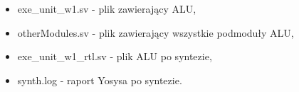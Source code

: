 \begin{itemize}
	\item exe\_unit\_w1.sv - plik zawierający ALU,
	\item otherModules.sv - plik zawierający wszystkie podmoduły ALU,
	\item exe\_unit\_w1\_rtl.sv - plik ALU po syntezie,
	\item synth.log - raport Yosysa po syntezie.
\end{itemize}